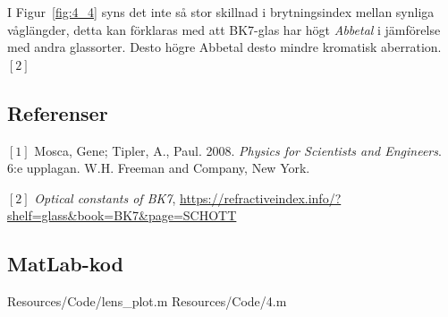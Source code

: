 I Figur~\ref{fig:4_4} syns det inte så stor skillnad i brytningsindex mellan synliga våglängder, detta kan förklaras med att BK7-glas har högt \emph{Abbetal} i jämförelse med andra glassorter. Desto högre Abbetal desto mindre kromatisk aberration. $[2]$ %

\subsection*{Referenser}
$[1]$ Mosca, Gene; Tipler, A., Paul. 2008. \textit{Physics for Scientists and Engineers}. 6:e upplagan. W.H. Freeman and Company, New York.
\vspace{2mm}

$[2]$ \textit{Optical constants of BK7},   \url{https://refractiveindex.info/?shelf=glass&book=BK7&page=SCHOTT}

\np
\subsection*{MatLab-kod}

 {Resources/Code/lens_plot.m}
 {Resources/Code/4.m}